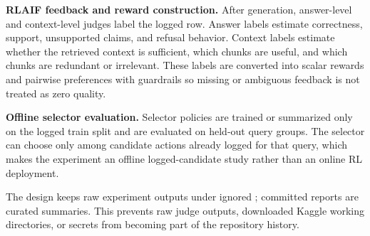 \textbf{RLAIF feedback and reward construction.} After generation, answer-level and context-level judges label the logged row. Answer labels estimate correctness, support, unsupported claims, and refusal behavior. Context labels estimate whether the retrieved context is sufficient, which chunks are useful, and which chunks are redundant or irrelevant. These labels are converted into scalar rewards and pairwise preferences with guardrails so missing or ambiguous feedback is not treated as zero quality.

\textbf{Offline selector evaluation.} Selector policies are trained or summarized only on the logged train split and are evaluated on held-out query groups. The selector can choose only among candidate actions already logged for that query, which makes the experiment an offline logged-candidate study rather than an online RL deployment.

The design keeps raw experiment outputs under ignored ; committed reports are curated summaries. This prevents raw judge outputs, downloaded Kaggle working directories, or secrets from becoming part of the repository history.
